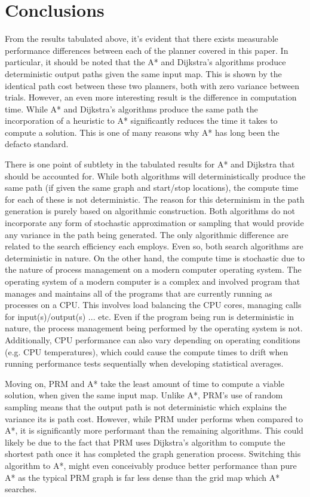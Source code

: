 \section{Conclusions}

From the results tabulated above, it's evident that there exists measurable performance differences between each of the planner covered in this paper. In particular, it should be noted that the A* and Dijkstra's algorithms produce deterministic output paths given the same input map. This is shown by the identical path cost between these two planners, both with zero variance between trials. However, an even more interesting result is the difference in computation time. While A* and Dijkstra's algorithms produce the same path the incorporation of a heuristic to A* significantly reduces the time it takes to compute a solution. This is one of many reasons why A* has long been the defacto standard. 

There is one point of subtlety in the tabulated results for A* and Dijkstra that should be accounted for. While both algorithms will deterministically produce the same path (if given the same graph and start/stop locations), the compute time for each of these is not deterministic. The reason for this determinism in the path generation is purely based on algorithmic construction. Both algorithms do not incorporate any form of stochastic approximation or sampling that would provide any variance in the path being generated. The only algorithmic difference are related to the search efficiency each employs. Even so, both search algorithms are deterministic in nature. On the other hand, the compute time is stochastic due to the nature of process management on a modern computer operating system. The operating system of a modern computer is a complex and involved program that manages and maintains all of the programs that are currently running as processes on a CPU. This involves load balancing the CPU cores, managing calls for input(s)/output(s) ... etc. Even if the program being run is deterministic in nature, the process management being performed by the operating system is not. Additionally, CPU performance can also vary depending on operating conditions (e.g. CPU temperatures), which could cause the compute times to drift when running performance tests sequentially when developing statistical averages. 


Moving on, PRM and A* take the least amount of time to compute a viable solution, when given the same input map. Unlike A*, PRM's use of random sampling means that the output path is not deterministic which explains the variance its is path cost. However, while PRM under performs when compared to A*, it is significantly more performant than the remaining algorithms. This could likely be due to the fact that PRM uses Dijkstra's algorithm to compute the shortest path once it has completed the graph generation process. Switching this algorithm to A*, might even conceivably produce better performance than pure A* as the typical PRM graph is far less dense than the grid map which A* searches. 

